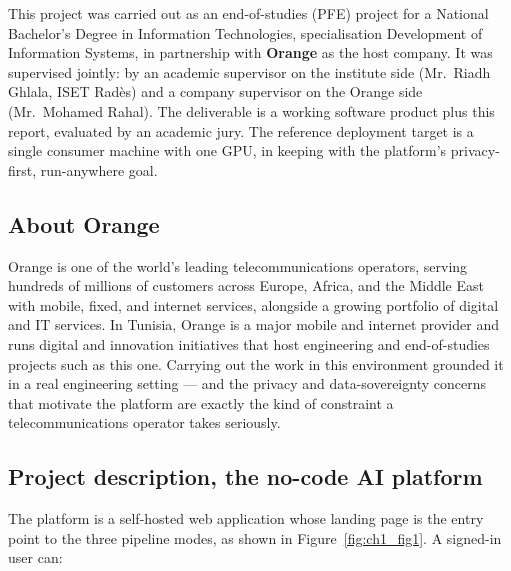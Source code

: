 \documentclass[12pt, a4paper, oneside]{report}
\begin{document}
This project was carried out as an end-of-studies (PFE) project for a
National Bachelor's Degree in Information Technologies, specialisation
Development of Information Systems, in partnership with \textbf{Orange}
as the host company. It was supervised jointly: by an academic
supervisor on the institute side (Mr.~Riadh Ghlala, ISET Rad\`es) and a
company supervisor on the Orange side (Mr.~Mohamed Rahal). The
deliverable is a working software product plus this report, evaluated by
an academic jury. The reference deployment target is a single consumer
machine with one GPU, in keeping with the platform's privacy-first,
run-anywhere goal.

\subsection{About Orange}

Orange is one of the world's leading telecommunications operators,
serving hundreds of millions of customers across Europe, Africa, and the
Middle East with mobile, fixed, and internet services, alongside a
growing portfolio of digital and IT services. In Tunisia, Orange is a
major mobile and internet provider and runs digital and innovation
initiatives that host engineering and end-of-studies projects such as
this one. Carrying out the work in this environment grounded it in a
real engineering setting --- and the privacy and data-sovereignty
concerns that motivate the platform are exactly the kind of constraint a
telecommunications operator takes seriously.

\subsection{Project description, the no-code AI platform}

The platform is a self-hosted web application whose landing page is the
entry point to the three pipeline modes, as shown in
Figure~\ref{fig:ch1_fig1}. A signed-in user can:
\end{document}
